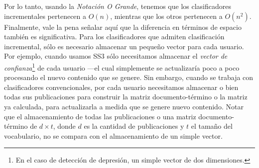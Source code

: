 Por lo tanto, usando la \emph{Notación O Grande}, tenemos que los clasificadores incrementales pertenecen a $O(n)$, mientras que los otros pertenecen a $O(n^2)$.
Finalmente, vale la pena señalar aquí que la diferencia en términos de espacio también es significativa. Para los clasificadores que admiten clasificación incremental, sólo es necesario almacenar un pequeño vector para cada usuario. Por ejemplo, cuando usamos SS3 sólo necesitamos almacenar el \emph{vector de confianza}\footnote{En el caso de detección de depresión, un simple vector de dos dimensiones.} de cada usuario ---el cual simplemente se actualizaría poco a poco procesando el nuevo contenido que se genere.
Sin embargo, cuando se trabaja con clasificadores convencionales, por cada usuario necesitamos almacenar o bien todas sus publicaciones para construir la matriz documento-término o la matriz ya calculada, para actualizarla a medida que se genere nuevo contenido.
Notar que el almacenamiento de todas las publicaciones o una matriz documento-término de $d\times t$, donde $d$ es la cantidad de publicaciones y $t$ el tamaño del vocabulario, no se compara con el almacenamiento de un simple vector.
